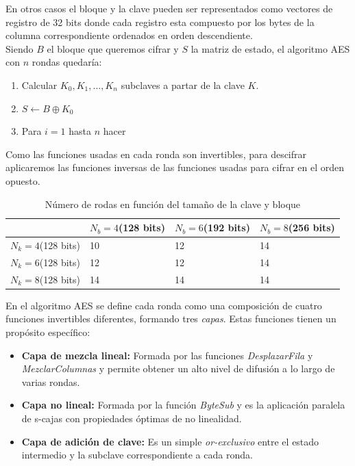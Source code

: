 En otros casos el bloque y la clave pueden ser representados como vectores de registro de 32 bits donde cada registro esta compuesto por los bytes de la columna correspondiente ordenados en orden descendiente.\\

Siendo $B$ el bloque que queremos cifrar y $S$ la matriz de estado, el algoritmo AES con $n$ rondas quedaría:

\begin{enumerate}
	\item Calcular $K_0, K_1,...,K_n$ subclaves a partar de la clave $K$.
	\item $S\leftarrow B \oplus K_0$
	\item Para $i=1$ hasta $n$ hacer
\end{enumerate}
Como las funciones usadas en cada ronda son invertibles, para descifrar aplicaremos las funciones inversas de las funciones usadas para cifrar en el orden opuesto.

\begin{table}[htb]
	\begin{center}
		\begin{tabular}{| l | l | l | l |}
				\hline
				& $N_b = 4$(128 bits) & $N_b = 6$(192 bits)& $N_b = 8$(256 bits)\\ \hline
				$N_k = 4$(128 bits)& 10 & 12 & 14\\ \hline
				$N_k = 6$(128 bits)& 12 & 12 & 14\\ \hline
				$N_k = 8$(128 bits)& 14 & 14 & 14\\ \hline
		\end{tabular}
		\caption{Número de rodas en función del tamaño de la clave y bloque}
		\label{rondas_aes}
	\end{center}
\end{table}


En el algoritmo AES se define cada ronda como una composición de cuatro funciones invertibles diferentes, formando tres \emph{capas}. Estas funciones tienen un propósito específico:
\begin{itemize}
	\item \textbf{Capa de mezcla lineal:} Formada por las funciones \emph{DesplazarFila} y \emph{MezclarColumnas} y permite obtener un alto nivel de difusión a lo largo de varias rondas.
	\item \textbf{Capa no lineal:} Formada por la función \emph{ByteSub} y es la aplicación paralela de s-cajas con propiedades óptimas de no linealidad.
	\item \textbf{Capa de adición de clave:} Es un simple \emph{or-exclusivo} entre el estado intermedio y la subclave correspondiente a cada ronda.
\end{itemize}

